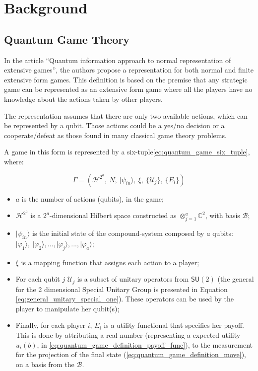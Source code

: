 \documentclass[10pt,twocolumn]{llncs}
\begin{document}

\section{Background}



\subsection{Quantum Game Theory}
\label{sec:background_quantum_game_theory}



In the article ``Quantum information approach to normal representation of extensive games''\cite{Fra2011a}, the authors propose a representation
for both normal and finite extensive form games\cite{Fra2011}. This definition is based on the premise that any strategic game can be represented as an extensive form game where all the players have no knowledge about the actions taken by other players. 

The representation assumes that there
are only two available actions, which can be represented by a qubit.
Those actions could be a yes/no decision or a cooperate/defeat as
those found in many classical game theory problems. 

A game in this
form is represented by a six-tuple\ref{eq:quantum_game_six_tuple},
where:

\begin{equation}
\Gamma=(\mathcal{H}^{2^{a}},\: N,\:\vert\psi_{in}\rangle,\:\xi,\:\{\mathcal{U}_{j}\},\:\{E_{i}\})\label{eq:quantum_game_six_tuple}
\end{equation}

\begin{itemize}
\item $a$ is the number of actions (qubits), in the game; 
\item $\mathcal{H}^{2^{a}}$ is a $2^{a}$-dimensional Hilbert space constructed
as $\otimes_{j=1}^{a}\mathbb{C}^{2}$, with basis $\mathcal{B}$;
\item $\vert\psi_{in}\rangle$ is the initial state of the compound-system
composed by $a$ qubits: $\vert\varphi_{1}\rangle,\:\vert\varphi_{2}\rangle, ..., \vert\varphi_{j}\rangle, ..., \vert\varphi_{a}\rangle$;
\item $\xi$ is a mapping function that assigns each action to a player;
\item For each qubit $j$ $\mathcal{U}_{j}$ is a subset of unitary operators from $\mathsf{SU}(2)$ (the general for the 2 dimensional Special Unitary Group is presented in Equation \ref{eq:general_unitary_special_one}).
These operators can be used by the player to manipulate her qubit(s);
\item Finally, for each player $i$, $E_{i}$ is a utility functional that
specifies her payoff. This is done by attributing a real number (representing a expected utility $ u_{i}(b)$, in \ref{eq:quantum_game_definition_payoff_func}), to the measurement for the projection of the final state (\ref{eq:quantum_game_definition_move}), on a basis from the $\mathcal{B}$.\end{itemize}
\end{document}
